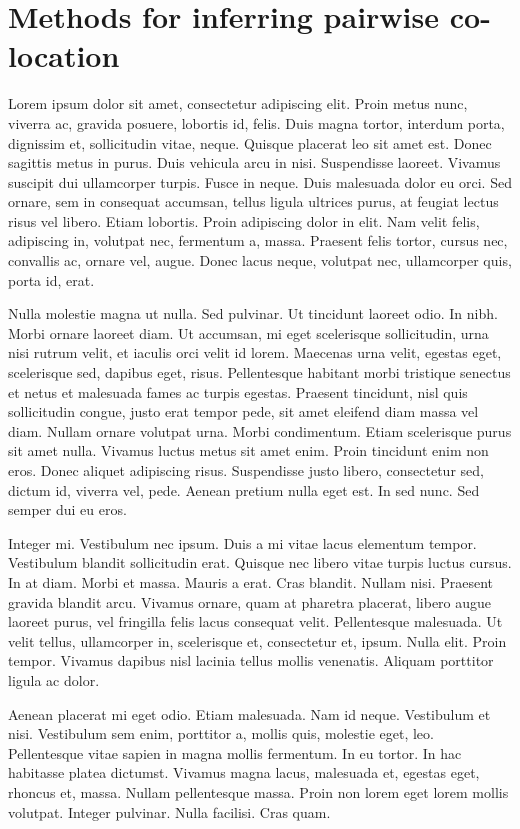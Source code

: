 \chapter{Methods for inferring pairwise co-location}

Lorem ipsum dolor sit amet, consectetur adipiscing elit. Proin metus nunc, viverra ac, gravida 
posuere, lobortis id, felis. Duis magna tortor, interdum porta, dignissim et, sollicitudin vitae, 
neque. Quisque placerat leo sit amet est. Donec sagittis metus in purus. Duis vehicula arcu in 
nisi. Suspendisse laoreet. Vivamus suscipit dui ullamcorper turpis. Fusce in neque. Duis malesuada 
dolor eu orci. Sed ornare, sem in consequat accumsan, tellus ligula ultrices purus, at feugiat 
lectus risus vel libero. Etiam lobortis. Proin adipiscing dolor in elit. Nam velit felis, 
adipiscing in, volutpat nec, fermentum a, massa. Praesent felis tortor, cursus nec, convallis ac, 
ornare vel, augue. Donec lacus neque, volutpat nec, ullamcorper quis, porta id, erat.

Nulla molestie magna ut nulla. Sed pulvinar. Ut tincidunt laoreet odio. In nibh. Morbi ornare laoreet diam. Ut accumsan, mi eget scelerisque sollicitudin, urna nisi rutrum velit, et iaculis orci velit id lorem. Maecenas urna velit, egestas eget, scelerisque sed, dapibus eget, risus. Pellentesque habitant morbi tristique senectus et netus et malesuada fames ac turpis egestas. Praesent tincidunt, nisl quis sollicitudin congue, justo erat tempor pede, sit amet eleifend diam massa vel diam. Nullam ornare volutpat urna. Morbi condimentum. Etiam scelerisque purus sit amet nulla. Vivamus luctus metus sit amet enim. Proin tincidunt enim non eros. Donec aliquet adipiscing risus. Suspendisse justo libero, consectetur sed, dictum id, viverra vel, pede. Aenean pretium nulla eget est. In sed nunc. Sed semper dui eu eros.

Integer mi. Vestibulum nec ipsum. Duis a mi vitae lacus elementum tempor. Vestibulum blandit sollicitudin erat. Quisque nec libero vitae turpis luctus cursus. In at diam. Morbi et massa. Mauris a erat. Cras blandit. Nullam nisi. Praesent gravida blandit arcu. Vivamus ornare, quam at pharetra placerat, libero augue laoreet purus, vel fringilla felis lacus consequat velit. Pellentesque malesuada. Ut velit tellus, ullamcorper in, scelerisque et, consectetur et, ipsum. Nulla elit. Proin tempor. Vivamus dapibus nisl lacinia tellus mollis venenatis. Aliquam porttitor ligula ac dolor.

Aenean placerat mi eget odio. Etiam malesuada. Nam id neque. Vestibulum et nisi. Vestibulum sem enim, porttitor a, mollis quis, molestie eget, leo. Pellentesque vitae sapien in magna mollis fermentum. In eu tortor. In hac habitasse platea dictumst. Vivamus magna lacus, malesuada et, egestas eget, rhoncus et, massa. Nullam pellentesque massa. Proin non lorem eget lorem mollis volutpat. Integer pulvinar. Nulla facilisi. Cras quam.

